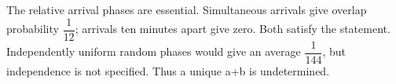 The relative arrival phases are essential. Simultaneous arrivals give overlap probability $\dfrac{1}{12}$; arrivals ten minutes apart give zero. Both satisfy the statement. Independently uniform random phases would give an average $\dfrac{1}{144}$, but independence is not specified. Thus a unique a+b is undetermined.
